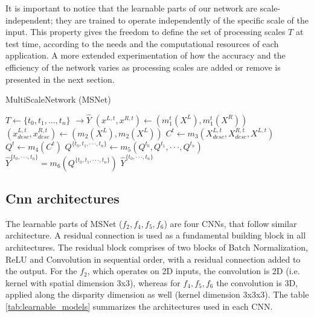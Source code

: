 \documentclass[runningheads]{llncs}
\begin{document}
It is important to notice that the learnable parts of our network are scale-independent; they are trained to operate independently of the specific scale of the input. This property gives the freedom to define the set of processing scales $T$ at test time, according to the needs and the computational resources of each application. A more extended experimentation of how the accuracy and the efficiency of the network varies as processing scales are added or remove is presented in the next section. 

\begin{algorithm}
\caption{MultiScaleNetwork (MSNet)}\label{alg:MSNET}
\begin{algorithmic}[1]
\State $T \gets \{ t_0, t_1, ... , t_n\}$ 
 $\rightarrow \hat{Y}$ 
\State $(x^{L,t},  x^{R,t}) \gets (m_1^t(X^L),m_1^t(X^R)) $ 
\State $(x^{L,t}_{desc}, x^{R,t}_{desc}) \gets (m_2(X^L), m_2(X^L))$ 
\State $C^{t} \gets m_3(X^{L,t}_{desc}, X^{R,t}_{desc}, X^{L,t})$ 
\State $Q^{t} \gets m_4(C^{t})$ 
\EndFor
\State $Q^{\{t_0, t_1, \cdot \cdot \cdot, t_n\}} \gets m_5(Q^{t_0}, Q^{t_1}, \cdot \cdot \cdot, Q^{t_n})$ 
\State $\hat{Y}^{\{ t_0, \cdot \cdot \cdot, t_n \}} = m_6(Q^{\{t_0, t_1, \cdot \cdot \cdot, t_n\}}) $ 
\State \Return $\hat{Y}^{\{ t_0, \cdot \cdot \cdot, t_n \}} $
\EndProcedure
\end{algorithmic}
\end{algorithm}

\subsection*{Cnn architectures}

The learnable parts of MSNet ($f_2, f_4, f_5, f_6$) are four CNNs, that follow similar architecture. A residual connection is used as a fundamental building block in all architectures. The residual block comprises of two blocks of Batch Normalization, ReLU and Convolution in sequential order, with a residual connection added to the output. For the $f_2$, which operates on 2D inputs, the convolution is 2D (i.e. kernel with spatial dimension 3x3), whereas for $f_4, f_5, f_6$ the convolution is 3D, applied along the disparity dimension as well (kernel dimension 3x3x3). The table \ref{tab:learnable_models} summarizes the architectures used in each CNN.
\end{document}
